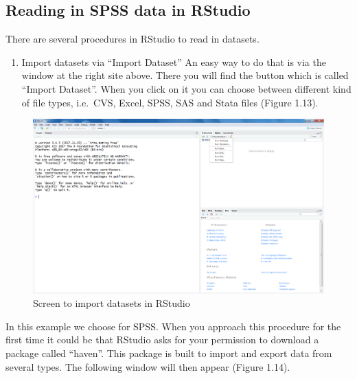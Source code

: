 \documentclass[]{book}
\providecommand{\tightlist}{%
  \setlength{\itemsep}{0pt}\setlength{\parskip}{0pt}}
\begin{document}
\subsection{Reading in SPSS data in
RStudio}\label{reading-in-spss-data-in-rstudio}

There are several procedures in RStudio to read in datasets.

\begin{enumerate}
\def\labelenumi{\arabic{enumi}.}
\tightlist
\item
  Import datasets via ``Import Dataset'' An easy way to do that is via
  the window at the right site above. There you will find the button
  which is called ``Import Dataset''. When you click on it you can
  choose between different kind of file types, i.e.~CVS, Excel, SPSS,
  SAS and Stata files (Figure 1.13).
\end{enumerate}

\begin{figure}

{\centering \includegraphics[width=0.9\linewidth]{images/fig1.13} 

}

\caption{Screen to import datasets in RStudio}\label{fig:fig13}
\end{figure}

In this example we choose for SPSS. When you approach this procedure for
the first time it could be that RStudio asks for your permission to
download a package called ``haven''. This package is built to import and
export data from several types. The following window will then appear
(Figure 1.14).
\end{document}
